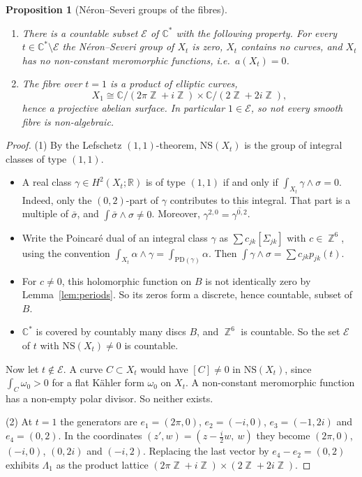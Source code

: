 \documentclass{article}
\DeclareMathOperator{\Z}{\mathbb{Z}}
\newtheorem{proposition}[theorem]{Proposition}
\theoremstyle{definition}
\theoremstyle{plain}
\newcommand{\R}{\mathbb{R}}
\newcommand{\C}{\mathbb{C}}
\begin{document}
\begin{proposition}[N\'eron--Severi groups of the fibres]\label{prop:NS}
\begin{enumerate}
\item There is a countable subset $\mathcal E$ of $\C^*$ with the following property.
  For every $t\in\C^*\setminus\mathcal E$ the N\'eron--Severi group of $X_t$ is zero,
  $X_t$ contains no curves, and $X_t$ has no non-constant meromorphic functions, i.e.\
  $a(X_t)=0$.
\item The fibre over $t=1$ is a product of elliptic curves,
  \[X_1\cong\C/(2\pi\Z+i\Z)\times\C/(2\Z+2i\Z),\]
  hence a projective abelian surface. In particular $1\in\mathcal E$, so not every
  smooth fibre is non-algebraic.
\end{enumerate}
\end{proposition}
\begin{proof}
(1) By the Lefschetz $(1,1)$-theorem, $\mathrm{NS}(X_t)$ is the group of integral
classes of type $(1,1)$.
\begin{itemize}
\item A real class $\gamma\in H^2(X_t;\R)$ is of type $(1,1)$ if and only if
  $\int_{X_t}\gamma\wedge\sigma=0$. Indeed, only the $(0,2)$-part of $\gamma$
  contributes to this integral. That part is a multiple of $\bar\sigma$, and
  $\int\bar\sigma\wedge\sigma\ne0$. Moreover, $\gamma^{2,0}=\overline{\gamma^{0,2}}$.
\item Write the Poincar\'e dual of an integral class $\gamma$ as
  $\sum c_{jk}[\Sigma_{jk}]$ with $c\in\Z^6$, using the convention
  $\int_{X_t}\alpha\wedge\gamma=\int_{\mathrm{PD}(\gamma)}\alpha$. Then
  $\int\gamma\wedge\sigma=\sum c_{jk}p_{jk}(t)$.
\item For $c\ne0$, this holomorphic function on $B$ is not identically zero by
  Lemma~\ref{lem:periods}. So its zeros form a discrete, hence countable, subset of
  $B$.
\item $\C^*$ is covered by countably many discs $B$, and $\Z^6$ is countable. So the
  set $\mathcal E$ of $t$ with $\mathrm{NS}(X_t)\ne0$ is countable.
\end{itemize}
Now let $t\notin\mathcal E$. A curve $C\subset X_t$ would have $[C]\ne0$ in
$\mathrm{NS}(X_t)$, since $\int_C\omega_0>0$ for a flat K\"ahler form $\omega_0$ on
$X_t$. A non-constant meromorphic function has a non-empty polar divisor. So neither
exists.

(2) At $t=1$ the generators are $e_1=(2\pi,0)$, $e_2=(-i,0)$, $e_3=(-1,2i)$ and
$e_4=(0,2)$. In the coordinates $(z',w)=(z-\tfrac i2w,\ w)$ they become $(2\pi,0)$,
$(-i,0)$, $(0,2i)$ and $(-i,2)$. Replacing the last vector by $e_4-e_2=(0,2)$ exhibits
$\Lambda_1$ as the product lattice $(2\pi\Z+i\Z)\times(2\Z+2i\Z)$.
\end{proof}
\end{document}
